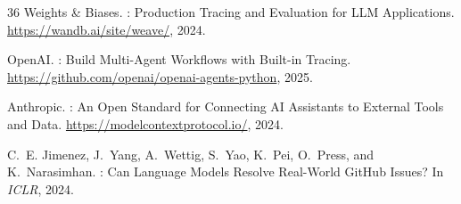 \documentclass[sigplan,10pt,screen]{acmart}
\begin{document}
\begin{thebibliography}{36}
{Weights \& Biases}.
: Production Tracing and Evaluation for {LLM} Applications.
\newblock \url{https://wandb.ai/site/weave/}, 2024.

{OpenAI}.
: Build Multi-Agent Workflows with Built-in
  Tracing.
\newblock \url{https://github.com/openai/openai-agents-python}, 2025.

{Anthropic}.
: An Open Standard for Connecting
  {AI} Assistants to External Tools and Data.
\newblock \url{https://modelcontextprotocol.io/}, 2024.

C.~E. Jimenez, J.~Yang, A.~Wettig, S.~Yao, K.~Pei, O.~Press, and
K.~Narasimhan.
: Can Language Models Resolve Real-World {GitHub} Issues?
\newblock In \emph{ICLR}, 2024.

\end{thebibliography}
\end{document}
